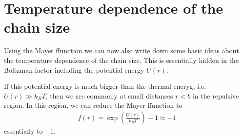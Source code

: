 \documentclass[letterpaper,10pt,english]{sphinxmanual}
\begin{document}
\section{Temperature dependence of the chain size}
\label{\detokenize{notebooks/L22/1_real_polymers:Temperature-dependence-of-the-chain-size}}
\sphinxAtStartPar
Using the Mayer f\sphinxhyphen{}function we can now also write down some basic ideas about the temperature dependence of the chain size. This is essentially hidden in the Boltzman factor including the potential energy \(U(r)\).

\sphinxAtStartPar
If this potential energy is much bigger than the thermal eneryg, i.e. \(U(r)\gg k_B T\), then we are commonly at small distances \(r<b\) in the repulsive region. In this region, we can reduce the Mayer f\sphinxhyphen{}function to
\begin{equation*}
\begin{split}f(r)=\exp\left ( \frac{U(r)}{k_B T}\right)-1 \approx -1\end{split}
\end{equation*}
\sphinxAtStartPar
essentially to \(-1\).
\end{document}
